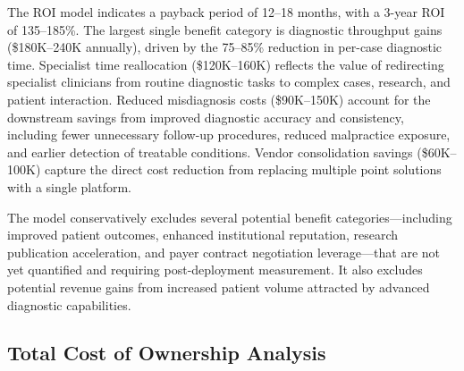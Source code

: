 The ROI model indicates a payback period of 12--18 months, with a 3-year ROI of 135--185\%. The largest single benefit category is diagnostic throughput gains (\$180K--240K annually), driven by the 75--85\% reduction in per-case diagnostic time. Specialist time reallocation (\$120K--160K) reflects the value of redirecting specialist clinicians from routine diagnostic tasks to complex cases, research, and patient interaction. Reduced misdiagnosis costs (\$90K--150K) account for the downstream savings from improved diagnostic accuracy and consistency, including fewer unnecessary follow-up procedures, reduced malpractice exposure, and earlier detection of treatable conditions. Vendor consolidation savings (\$60K--100K) capture the direct cost reduction from replacing multiple point solutions with a single platform.

The model conservatively excludes several potential benefit categories---including improved patient outcomes, enhanced institutional reputation, research publication acceleration, and payer contract negotiation leverage---that are not yet quantified and requiring post-deployment measurement. It also excludes potential revenue gains from increased patient volume attracted by advanced diagnostic capabilities.

\subsection{Total Cost of Ownership Analysis}

